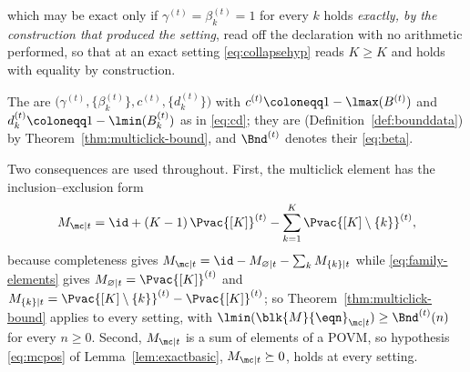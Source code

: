 \begin{definition}
\begin{enumerate}[label=(\alph*),leftmargin=2.6em]
  which may be $\mathrm{exact}$ only if $\gamma^{(t)}=\beta^{(t)}_k=1$ for
  every $k$ holds \emph{exactly, by the construction that produced the
  setting}, read off the declaration with no arithmetic performed, so that
  at an exact setting \eqref{eq:collapsehyp} reads $K\ge K$ and holds with
  equality by construction.
\end{enumerate}
The
are $\big(\gamma^{(t)},\{\beta^{(t)}_k\},c^{(t)},\{d^{(t)}_k\}\big)$ with
$c^{(t)}\coloneqq1-\lmax(B^{(t)})$ and $d^{(t)}_k\coloneqq1-\lmin(B^{(t)}_k)$
as in \eqref{eq:cd}; they are 
(Definition~\ref{def:bounddata}) by Theorem~\ref{thm:multiclick-bound}, and
$\Bnd^{(t)}$ denotes their  \eqref{eq:beta}.

Two consequences are used throughout. First, the multiclick element has the
inclusion--exclusion form
\begin{equation}\label{eq:family-mc}
  M_{\mc|t}=\id+(K-1)\,\Pvac{[K]}^{(t)}-\sum_{k=1}^{K}\Pvac{[K]\setminus\{k\}}^{(t)} ,
\end{equation}
because completeness gives $M_{\mc|t}=\id-M_{\varnothing|t}-\sum_kM_{\{k\}|t}$
while \eqref{eq:family-elements} gives $M_{\varnothing|t}=\Pvac{[K]}^{(t)}$
and $M_{\{k\}|t}=\Pvac{[K]\setminus\{k\}}^{(t)}-\Pvac{[K]}^{(t)}$; so
Theorem~\ref{thm:multiclick-bound} applies to every setting, with
$\lmin(\blk{M}{\eqn}_{\mc|t})\ge\Bnd^{(t)}(n)$ for every $n\ge0$. Second,
$M_{\mc|t}$ is a sum of elements of a POVM, so hypothesis \eqref{eq:mcpos}
of Lemma~\ref{lem:exactbasic}, $M_{\mc|t}\succeq0$, holds at every setting.
\end{definition}
